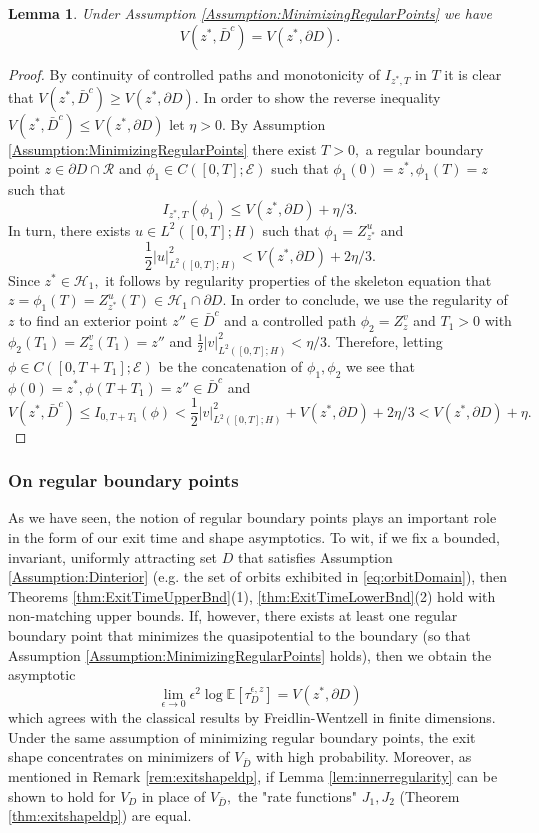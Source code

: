 \documentclass[10pt, reqno]{amsart}
\newcommand{\ex}{\mathbb{E}}
\newcommand{\h}{\mathcal{H}}
\newcommand{\e}{\mathcal{E}}
\newtheorem{lem}{Lemma}
\theoremstyle{definition}
\numberwithin{lem}{section}
\numberwithin{cor}{section}
\numberwithin{prop}{section}
\numberwithin{thm}{section}
\numberwithin{dfn}{section}
\begin{document}
     
       
       
       
       \begin{lem} Under Assumption \ref{Assumption:MinimizingRegularPoints} we have $$V(z^*, \bar{D}^c)=V(z^*, \partial D).$$
      \end{lem}
      \begin{proof} By continuity of controlled paths and monotonicity of $I_{z^*, T}$ in $T$ it is clear that $V(z^*, \bar{D}^c)\geq V(z^*, \partial D).$ In order to show the reverse inequality
      $V(z^*, \bar{D}^c)\leq V(z^*, \partial D)$
      let $\eta>0.$ By Assumption \ref{Assumption:MinimizingRegularPoints} there exist $T>0,$ a regular boundary point $ z\in\partial D\cap\mathcal{R}$ and $\phi_1\in C([0,T];\e)$ such that $\phi_1(0)=z^*, \phi_1(T)=z$ such that 
      $$  I_{z^*,T}(\phi_1)\leq V(z^*, \partial D)+\eta/3.     $$
      In turn, there exists  $u\in L^2([0,T];H)$ such that $\phi_1=Z_{z^*}^u$ and 
      $$ \frac{1}{2} |u|^2_{L^2([0,T];H)}<V(z^*, \partial D)+2\eta/3.$$
      Since $z^*\in\h_1,$ it follows by regularity properties of the skeleton equation that $z=\phi_1(T)=Z_{z^*}^u(T)\in\h_1\cap\partial D.$ In order to conclude, we use the regularity of $z$ to find an exterior point $z''\in\bar{D}^c$ and a controlled path $\phi_2=Z_z^v$ and $T_1>0$ with $\phi_2(T_1)=Z_z^v(T_1)=z''$ and $\frac{1}{2}|v|_{L^2([0,T];H)}^2<\eta/3.$ Therefore, letting $\phi\in C([0,T+T_1];\e)$ be the concatenation of $\phi_1, \phi_2$ we see that 
      $\phi(0)=z^*, \phi(T+T_1)=z''\in\bar{D}^c$ and
           $$  V(z^*, \bar{D}^c)\leq I_{0,T+T_1}(\phi)< \frac{1}{2}|v|_{L^2([0,T];H)}^2+V(z^*, \partial D)+2\eta/3<  V(z^*, \partial D)+\eta.$$       \end{proof}    
      \subsubsection{\textbf{On regular boundary points}}

      As we have seen, the notion of regular boundary points plays an important role in the form of our exit time and shape asymptotics. To wit, if we fix a bounded, invariant, uniformly attracting set $D$ that satisfies Assumption \ref{Assumption:Dinterior} (e.g. the set of orbits exhibited in \eqref{eq:orbitDomain}), then  Theorems \ref{thm:ExitTimeUpperBnd}(1), \ref{thm:ExitTimeLowerBnd}(2) hold with non-matching upper bounds. If, however, there exists at least one regular boundary point that minimizes the quasipotential to the boundary (so that Assumption 
      \ref{Assumption:MinimizingRegularPoints} holds), then we obtain the asymptotic
      $$\lim_{\epsilon\to 0}\epsilon^2\log\ex[\tau^{\epsilon,z}_D]=V(z^*,\partial D)      $$
      which agrees with the classical results by Freidlin-Wentzell in finite dimensions. Under the same assumption of minimizing regular boundary points, the exit shape concentrates on minimizers of $V_{\bar{D}}$ with high probability. Moreover, as mentioned in Remark \ref{rem:exitshapeldp}, if Lemma \ref{lem:innerregularity} can be shown to hold for $V_D$ in place of $V_{\bar{D}},$ the "rate functions" $J_1,J_2$ (Theorem \ref{thm:exitshapeldp}) are equal.
      
\end{document}
